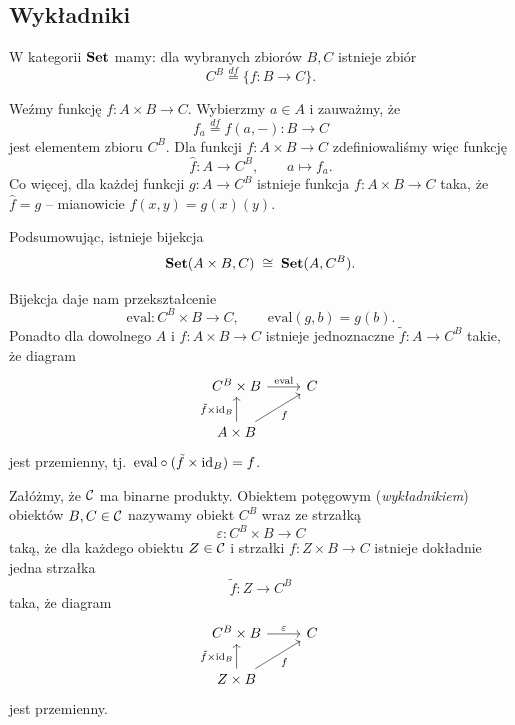 \subsection*{Wykładniki}

\begin{przyklad}
W kategorii $\mathbf{Set}$ mamy: dla wybranych zbiorów $B, C$ istnieje zbiór
\[
C^B \stackrel{df}{=} \{f : B \to C\}.
\]
\end{przyklad}

\begin{uwaga}
Weźmy funkcję $f : A \times B \to C$. Wybierzmy $a \in A$ i zauważmy, że
\[
f_a \stackrel{df}{=} f(a, -) : B \to C
\]
jest elementem zbioru $C^B$. Dla funkcji $f : A \times B \to C$ zdefiniowaliśmy więc funkcję
\[
\hat{f} : A \to C^B, \qquad a \mapsto f_a.
\]
Co więcej, dla każdej funkcji $g : A \to C^B$ istnieje funkcja $f : A \times B \to C$ taka, że $\hat{f} = g$ -- mianowicie $f(x, y) = g(x)(y)$.

Podsumowując, istnieje bijekcja
\[
\mathbf{Set}(A \times B, C) \;\cong\; \mathbf{Set}(A, C^B).
\]
\end{uwaga}

\begin{uwaga}
Bijekcja daje nam przekształcenie
\[
\mathrm{eval} : C^B \times B \to C, \qquad \mathrm{eval}(g, b) = g(b).
\]
Ponadto dla dowolnego $A$ i $f : A \times B \to C$ istnieje jednoznaczne $\tilde{f} : A \to C^B$ takie, że diagram
\[
\begin{tikzcd}
C^B \times B \arrow[r, "\mathrm{eval}"] & C \\
A \times B \arrow[u, "\tilde{f} \times \id_B"] \arrow[ur, "f"'] &
\end{tikzcd}
\]
jest przemienny, tj.\ $\mathrm{eval}\circ(\tilde f\times\mathrm{id}_B) = f$.
\end{uwaga}

\begin{definicja}\label{def:wykladnik}
Załóżmy, że $\mathcal{C}$ ma binarne produkty. Obiektem potęgowym (\emph{wykładnikiem}) obiektów $B, C \in \mathcal{C}$ nazywamy obiekt $C^B$ wraz ze strzałką
\[
\varepsilon : C^B \times B \to C
\]
taką, że dla każdego obiektu $Z \in \mathcal{C}$ i strzałki $f : Z \times B \to C$ istnieje dokładnie jedna strzałka
\[
\tilde{f} : Z \to C^B
\]
taka, że diagram
\[
\begin{tikzcd}
C^B \times B \arrow[r, "\varepsilon"] & C \\
Z \times B \arrow[u, "\tilde{f} \times \id_B"] \arrow[ur, "f"'] &
\end{tikzcd}
\]
jest przemienny.
\end{definicja}

